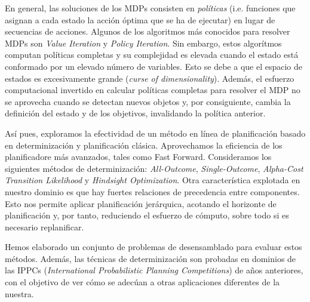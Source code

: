 En general, las soluciones de los MDPs consisten en \emph{políticas} (i.e.
funciones que asignan a cada estado la acción óptima que se ha de ejecutar)
en lugar de secuencias de acciones. Algunos de los algoritmos más conocidos para
resolver MDPs son \emph{Value Iteration} y \emph{Policy Iteration}. Sin embargo,
estos algorítmos computan políticas completas y su complejidad es elevada cuando
el estado está conformado por un elevado número de variables. Esto se debe a que
el espacio de estados es excesivamente grande (\emph{curse of dimensionality}).
Además, el esfuerzo computacional invertido en calcular políticas completas para
resolver el MDP no se aprovecha cuando se detectan nuevos objetos y, por consiguiente,
cambia la definición del estado y de los objetivos, invalidando la política anterior.

Así pues, exploramos la efectividad de un método en línea de planificación
basado en determinización y planificación clásica. Aprovechamos la eficiencia
de los planificadore más avanzados, tales como Fast Forward. Consideramos
los siguientes métodos de determinización: \emph{All-Outcome}, \emph{Single-Outcome},
\emph{Alpha-Cost Transition Likelihood} y \emph{Hindsight Optimization}. Otra
característica explotada en nuestro dominio es que hay fuertes relaciones de
precedencia entre componentes. Esto nos permite aplicar planificación jerárquica,
acotando el horizonte de planificación y, por tanto, reduciendo el esfuerzo
de cómputo, sobre todo si es necesario replanificar.

Hemos elaborado un conjunto de problemas de desensamblado para evaluar estos
métodos. Además, las técnicas de determinización son probadas en dominios
de las IPPCs (\emph{International Probabilistic Planning Competitions}) de años
anteriores, con el objetivo de ver cómo se adecúan a otras aplicaciones
diferentes de la nuestra.

